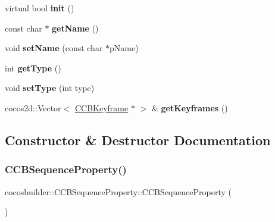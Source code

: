 \begin{DoxyCompactItemize}
\item 
\mbox{\label{classcocosbuilder_1_1CCBSequenceProperty_afca54a369c382cd137e798d13c87d490}} 
virtual bool {\bfseries init} ()
\item 
\mbox{\label{classcocosbuilder_1_1CCBSequenceProperty_a925f53dc95f2ed4e1c69883a0da0aa98}} 
const char $\ast$ {\bfseries get\+Name} ()
\item 
\mbox{\label{classcocosbuilder_1_1CCBSequenceProperty_ad3b7d2aeac32c07c117babd19ab98b99}} 
void {\bfseries set\+Name} (const char $\ast$p\+Name)
\item 
\mbox{\label{classcocosbuilder_1_1CCBSequenceProperty_a6b059f06960d9884cedd82af7688395f}} 
int {\bfseries get\+Type} ()
\item 
\mbox{\label{classcocosbuilder_1_1CCBSequenceProperty_a6388ff214d6719f3882f822fec102ae7}} 
void {\bfseries set\+Type} (int type)
\item 
\mbox{\label{classcocosbuilder_1_1CCBSequenceProperty_a1e2c7d3fc6f9f162dfbe5cfed19351de}} 
cocos2d\+::\+Vector$<$ \hyperlink{classcocosbuilder_1_1CCBKeyframe}{C\+C\+B\+Keyframe} $\ast$ $>$ \& {\bfseries get\+Keyframes} ()
\end{DoxyCompactItemize}


\subsection{Constructor \& Destructor Documentation}
\mbox{\label{classcocosbuilder_1_1CCBSequenceProperty_adef6c18a9d0ba1842c84861e5562e11c}} 
\subsubsection{\texorpdfstring{C\+C\+B\+Sequence\+Property()}{CCBSequenceProperty()}\hspace{0.1cm}{\footnotesize\ttfamily [1/2]}}
{\footnotesize\ttfamily cocosbuilder\+::\+C\+C\+B\+Sequence\+Property\+::\+C\+C\+B\+Sequence\+Property (\begin{DoxyParamCaption}{ }\end{DoxyParamCaption})}


